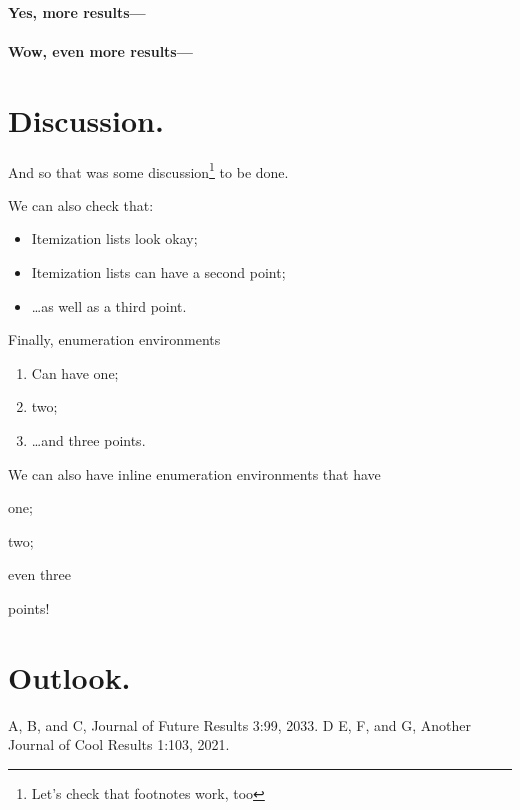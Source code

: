 \documentclass[
    papertype=a4paper,
]{phfextendedabstract}
\begin{document}
\paragraph{Yes, more results---}
\lipsum[6]

\paragraph{Wow, even more results---}
\lipsum[7]

\section{Discussion.}
\lipsum[8]

And so that was some discussion\footnote{Let's check that footnotes work, too} to be done.

We can also check that:
\begin{itemize}
\item Itemization lists look okay;
\item Itemization lists can have a second point;
\item \ldots as well as a third point.
\end{itemize}

Finally, enumeration environments
\begin{enumerate}
\item Can have one;
\item two;
\item \ldots and three points.
\end{enumerate}

We can also have inline enumeration environments that have
\begin{enumerate*}[label=\textbf{(\roman*)},itemjoin*={{ \ldots\ and }}]
\item one;
\item two;
\item even three
\end{enumerate*}
points!

\section{Outlook.}
\lipsum[9]


\begin{thebibliography}{9}
  A, B, and C, Journal of Future Results 3:99, 2033.
  D E, F, and G, Another Journal of Cool Results 1:103, 2021.
\end{thebibliography}
\end{document}
